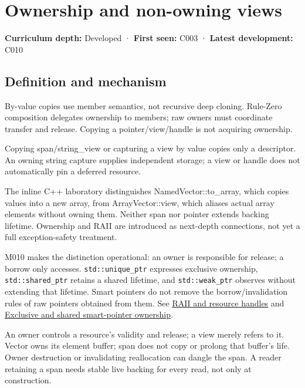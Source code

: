 \hypertarget{appendix-d52e4486f527}{}\label{referencestart:appendix-d52e4486f527}
\section{Ownership and non-owning views}\label{appendix-d52e4486f527-ownership-and-non-owning-views}

\textbf{Curriculum depth:} Developed · \textbf{First seen:} C003 · \textbf{Latest development:} C010

\subsection{Definition and mechanism}\label{appendix-d52e4486f527-definition-and-mechanism}

By-value copies use member semantics, not recursive deep cloning. Rule-Zero composition delegates ownership to members; raw owners must coordinate transfer and release. Copying a pointer/view/handle is not acquiring ownership.

Copying span/string\_view or capturing a view by value copies only a descriptor. An owning string capture supplies independent storage; a view or handle does not automatically pin a deferred resource.

The inline C++ laboratory distinguishes NamedVector::to\_array, which copies values into a new array, from ArrayVector::view, which aliases actual array elements without owning them. Neither span nor pointer extends backing lifetime. Ownership and RAII are introduced as next-depth connections, not yet a full exception-safety treatment.

M010 makes the distinction operational: an owner is responsible for release; a borrow only accesses. \texttt{std::unique\_ptr} expresses exclusive ownership, \texttt{std::shared\_ptr} retains a shared lifetime, and \texttt{std::weak\_ptr} observes without extending that lifetime. Smart pointers do not remove the borrow/invalidation rules of raw pointers obtained from them. See \hyperref[appendix-69739d3ab49b]{RAII and resource handles} and \hyperref[appendix-51602cabe815]{Exclusive and shared smart-pointer ownership}.

An owner controls a resource's validity and release; a view merely refers to it. Vector owns its element buffer; span does not copy or prolong that buffer's life. Owner destruction or invalidating reallocation can dangle the span. A reader retaining a span needs stable live backing for every read, not only at construction.

